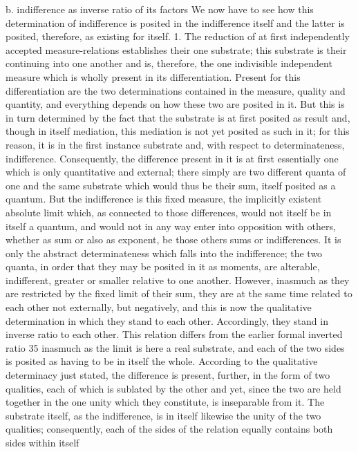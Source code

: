 b. indifference as inverse ratio of its factors
We now have to see how this determination of indifference is posited in
the indifference itself and the latter is posited, therefore, as existing for itself.
1. The reduction of at first independently accepted measure-relations
establishes their one substrate; this substrate is their continuing into one
another and is, therefore, the one indivisible independent measure which
is wholly present in its differentiation. Present for this differentiation are
the two determinations contained in the measure, quality and quantity,
and everything depends on how these two are posited in it. But this is in
turn determined by the fact that the substrate is at first posited as result
and, though in itself mediation, this mediation is not yet posited as such
in it; for this reason, it is in the first instance substrate and, with respect to
determinateness, indifference.
Consequently, the difference present in it is at first essentially one which
is only quantitative and external; there simply are two different quanta of
one and the same substrate which would thus be their sum, itself posited as a
quantum. But the indifference is this fixed measure, the implicitly existent
absolute limit which, as connected to those differences, would not itself
be in itself a quantum, and would not in any way enter into opposition
with others, whether as sum or also as exponent, be those others sums
or indifferences. It is only the abstract determinateness which falls into
the indifference; the two quanta, in order that they may be posited in it
as moments, are alterable, indifferent, greater or smaller relative to one
another. However, inasmuch as they are restricted by the fixed limit of
their sum, they are at the same time related to each other not externally,
but negatively, and this is now the qualitative determination in which they
stand to each other. Accordingly, they stand in inverse ratio to each other.
This relation differs from the earlier formal inverted ratio 35 inasmuch as
the limit is here a real substrate, and each of the two sides is posited as
having to be in itself the whole.
According to the qualitative determinacy just stated, the difference is
present, further, in the form of two qualities, each of which is sublated
by the other and yet, since the two are held together in the one unity
which they constitute, is inseparable from it. The substrate itself, as the
indifference, is in itself likewise the unity of the two qualities; consequently,
each of the sides of the relation equally contains both sides within itself
